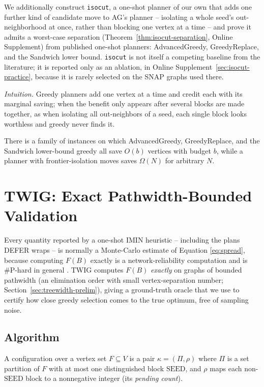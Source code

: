 \documentclass[ijoc,sglanonrev]{informs4}
\newcommand{\FF}{F}
\begin{document}
We additionally construct \texttt{isocut}, a one-shot planner of our own
that adds one further kind of candidate move to AG's planner --
isolating a whole seed's out-neighborhood at once, rather than blocking
one vertex at a time -- and prove it admits a worst-case separation
(Theorem~\ref{thm:isocut-separation}, Online Supplement) from published
one-shot planners: AdvancedGreedy, GreedyReplace, and the Sandwich lower
bound. \texttt{isocut} is not itself a competing baseline from the
literature; it is reported only as an ablation, in
Online Supplement~\ref{sec:isocut-practice}, because it is rarely selected
on the SNAP graphs used there.

\emph{Intuition.} Greedy planners add one vertex at a time and credit each
with its marginal saving; when the benefit only appears after several
blocks are made together, as when isolating all out-neighbors of a seed, each
single block looks worthless and greedy never finds it.

\begin{theorem}\label{thm:isocut-separation}
There is a family of instances on which AdvancedGreedy, GreedyReplace, and
the Sandwich lower-bound greedy all save $O(b)$ vertices with budget $b$,
while a planner with frontier-isolation moves saves $\Omega(N)$ for
arbitrary $N$.
\end{theorem}

\section{TWIG: Exact Pathwidth-Bounded Validation}\label{sec:twig}

Every quantity reported by a one-shot IMIN heuristic -- including the plans
DEFER wraps -- is normally a Monte-Carlo estimate of Equation
\eqref{eq:spread}, because computing $\FF(B)$ exactly is a network-reliability
computation and is \#P-hard in general \citep{valiant1979,provan1983}. TWIG
computes $\FF(B)$ \emph{exactly} on graphs of bounded pathwidth (an elimination
order with small vertex-separation number; Section~\ref{sec:treewidth-prelim}),
giving a ground-truth oracle that we use to certify how close greedy
selection comes to the true optimum, free of sampling noise.

\subsection{Algorithm}\label{sec:twig-algo}

\begin{definition}[Configuration]\label{def:config}
A configuration over a vertex set $F\subseteq V$ is a pair
$\kappa=(\Pi,\rho)$ where $\Pi$ is a set partition of $F$ with at most one
distinguished block $\mathrm{SEED}$, and $\rho$ maps each non-$\mathrm{SEED}$
block to a nonnegative integer (its \emph{pending count}).
\end{definition}
\end{document}
